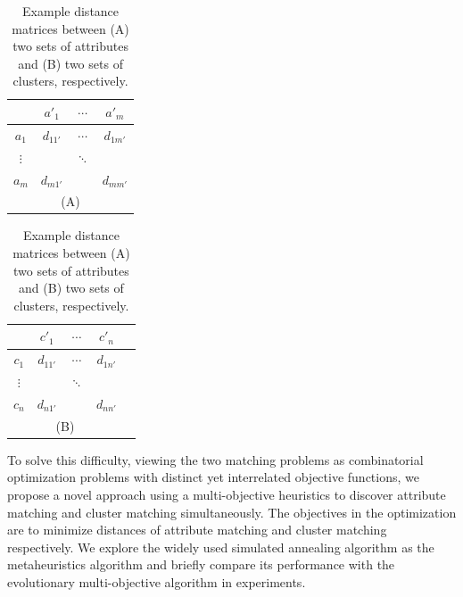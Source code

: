 \begin{table}
\begin{center}
\begin{minipage}{0.45\linewidth}\centering
\begin{tabular}{c | c c c}
	& \textbf{$a'_1$}		& $\cdots$ & \textbf{$a'_m$}\\
\hline
\textbf{$a_1$}	& $d_{11'}$ & $\cdots$  & $d_{1m'}$\\
$\vdots$        &           & $\ddots$  &\\
\textbf{$a_m$}	& $d_{m1'}$	&           & $d_{mm'}$\\
\multicolumn{4}{c}{(A)}\\
\end{tabular}
\end{minipage}
\hspace{.5cm}
\begin{minipage}{0.45\linewidth}\centering
\begin{tabular}{c | c c c c}
	& \textbf{$c'_1$}	& $\cdots$ & \textbf{$c'_n$}\\
\hline
\textbf{$c_1$}	& $d_{11'}$ & $\cdots$  & $d_{1n'}$\\
$\vdots$        &           & $\ddots$  &\\
\textbf{$c_n$}	& $d_{n1'}$	&           & $d_{nn'}$\\
\multicolumn{4}{c}{(B)}\\
\end{tabular}
\end{minipage}
\end{center}
\caption[Example distance matrices]{\label{tbl:sim_mat} Example distance matrices between (A) two sets of attributes and (B) two sets of clusters, respectively.}
\end{table}

To solve this difficulty, viewing the two matching problems as combinatorial optimization problems with distinct yet interrelated objective functions, we propose a novel approach using a multi-objective heuristics to discover attribute matching and cluster matching simultaneously. The objectives in the optimization are to minimize distances of attribute matching and cluster matching respectively. We explore the widely used simulated annealing algorithm as the metaheuristics algorithm and briefly compare its performance with the evolutionary multi-objective algorithm in experiments.

